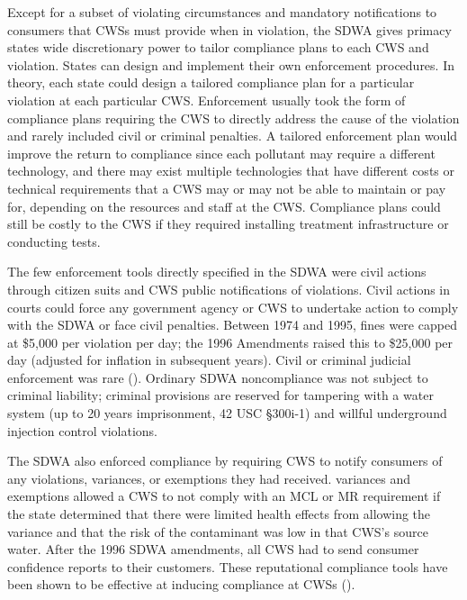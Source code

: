 \documentclass{article}
\begin{document}
Except for a subset of violating circumstances and mandatory notifications to consumers that CWSs must provide when in violation, the SDWA gives primacy states wide discretionary power to tailor compliance plans to each CWS and violation. States can design and implement their own enforcement procedures. In theory, each state could design a tailored compliance plan for a particular violation at each particular CWS. Enforcement usually took the form of compliance plans requiring the CWS to directly address the cause of the violation and rarely included civil or criminal penalties. A tailored enforcement plan would improve the return to compliance since each pollutant may require a different technology, and there may exist multiple technologies that have different costs or technical requirements that a CWS may or may not be able to maintain or pay for, depending on the resources and staff at the CWS. Compliance plans could still be costly to the CWS if they required installing treatment infrastructure or conducting tests. 

The few enforcement tools directly specified in the SDWA were civil actions through citizen suits and CWS public notifications of violations. Civil actions in courts could force any government agency or CWS to undertake action to comply with the SDWA or face civil penalties. Between 1974 and 1995, fines were capped at \$5,000 per violation per day; the 1996 Amendments raised this to \$25,000 per day (adjusted for inflation in subsequent years). Civil or criminal judicial enforcement was rare (\cite{shimshack2014economics}). Ordinary SDWA noncompliance was not subject to criminal liability; criminal provisions are reserved for tampering with a water system (up to 20 years imprisonment, 42 USC §300i-1) and willful underground injection control violations.

The SDWA also enforced compliance by requiring CWS to notify consumers of any violations, variances, or exemptions they had received. variances and exemptions allowed a CWS to not comply with an MCL or MR requirement if the state determined that there were limited health effects from allowing the variance and that the risk of the contaminant was low in that CWS's source water. After the 1996 SDWA amendments, all CWS had to send consumer confidence reports to their customers. These reputational compliance tools have been shown to be effective at inducing compliance at CWSs (\cite{bennear2008impacts}).


\end{document}
